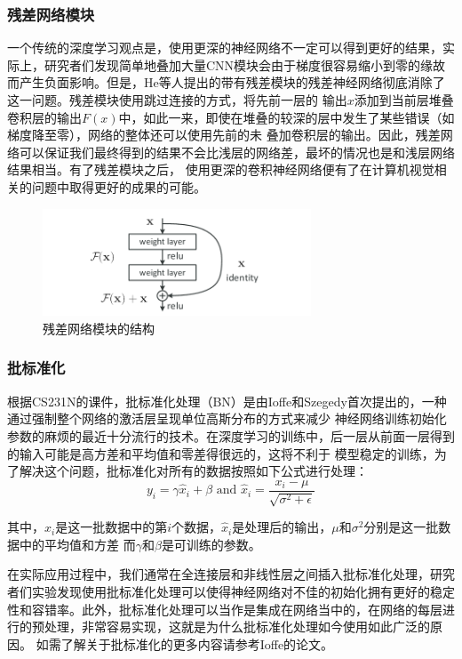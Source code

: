 \documentclass[supercite]{HustGraduPaper}
\theoremstyle{definition}
\begin{document}
\subsubsection{残差网络模块}

一个传统的深度学习观点是，使用更深的神经网络不一定可以得到更好的结果，实际上，研究者们发现简单地叠加大量CNN模块会由于梯度很容易缩小到零的缘故
而产生负面影响。但是，He等人\cite{he2015deep}提出的带有残差模块的残差神经网络彻底消除了这一问题。残差模块使用跳过连接的方式，将先前一层的
输出$x$添加到当前层堆叠卷积层的输出$F(x)$中，如此一来，即使在堆叠的较深的层中发生了某些错误（如梯度降至零），网络的整体还可以使用先前的未
叠加卷积层的输出。因此，残差网络可以保证我们最终得到的结果不会比浅层的网络差，最坏的情况也是和浅层网络结果相当。有了残差模块之后，
使用更深的卷积神经网络便有了在计算机视觉相关的问题中取得更好的成果的可能。
\begin{figure}[H]
  \begin{center}
  \includegraphics[width=8cm]{images/resnet}
  \end{center}
  \caption{残差网络模块的结构}
  \label{fig:Res-structure}
\end{figure}

\subsubsection{批标准化}
\label{sec:BN}
根据CS231N\cite{cs231n}的课件，批标准化处理（BN）是由Ioffe和Szegedy首次提出的，一种通过强制整个网络的激活层呈现单位高斯分布的方式来减少
神经网络训练初始化参数的麻烦的最近十分流行的技术。在深度学习的训练中，后一层从前面一层得到的输入可能是高方差和平均值和零差得很远的，这将不利于
模型稳定的训练，为了解决这个问题，批标准化对所有的数据按照如下公式进行处理：
$$y_{i}=\gamma \hat{x}_{i}+\beta \text { and } \hat{x}_{i}=\frac{x_{i}-\mu}{\sqrt{\sigma^{2}+\epsilon}}$$

其中，$x_{i}$是这一批数据中的第$i$个数据，$\hat{x}_{i}$是处理后的输出，$\mu$和$\sigma^{2}$分别是这一批数据中的平均值和方差 
而$\gamma$和$\beta$是可训练的参数。

在实际应用过程中，我们通常在全连接层和非线性层之间插入批标准化处理，研究者们实验发现使用批标准化处理可以使得神经网络对不佳的初始化拥有更好的稳定
性和容错率。此外，批标准化处理可以当作是集成在网络当中的，在网络的每层进行的预处理，非常容易实现，这就是为什么批标准化处理如今使用如此广泛的原因。
如需了解关于批标准化的更多内容请参考Ioffe的论文\cite{ioffe2015batch}。
\end{document}
